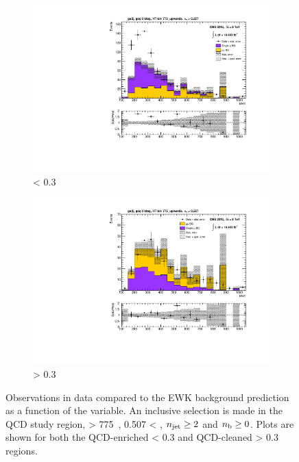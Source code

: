 \begin{figure}[h!]
  \centering
  \begin{subfigure}[b]{0.46\textwidth}
    \includegraphics[width=\textwidth]
    {Figs/datapred/qcd_study_region/ge2j_ge0b_775_upwards/Prediction_MHT_all_775_upwards.pdf}
    \caption{\mindphistar < 0.3}
    \label{fig:datapred_mht_lt0p3}
  \end{subfigure}
  \begin{subfigure}[b]{0.46\textwidth}
    \includegraphics[width=\textwidth]
    {Figs/datapred/qcd_study_region/ge2j_ge0b_775_upwards/gt0p3/Prediction_MHT_all_775_upwards.pdf}
    \caption{\mindphistar > 0.3}
    \label{fig:datapred_mht_gt0p3}
  \end{subfigure}
  \caption{Observations in data compared to the EWK background prediction
  as a function of the \mht variable.
  An inclusive selection is made in the QCD study region, \HT > 775~\gev,
  0.507 < \alphat, $n_{\text{jet}} \geq 2$ and $n_{\text{b}} \geq 0$. Plots are shown for
  both the
  QCD-enriched \mindphistar < 0.3 and QCD-cleaned \mindphistar > 0.3 regions.}
  \label{fig:datapred_mht_before_after_dphi}
\end{figure}

